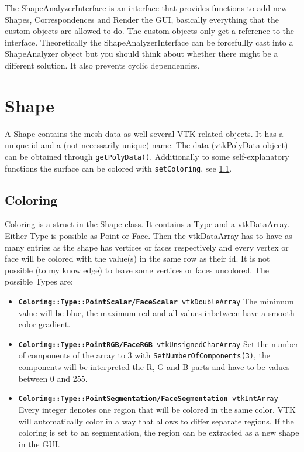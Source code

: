 The ShapeAnalyzerInterface is an interface that provides functions to add new Shapes, Correspondences and Render the GUI, basically everything that the custom objects are allowed to do. The custom objects only get a reference to the interface. Theoretically the ShapeAnalyzerInterface can be forcefullly cast into a ShapeAnalyzer object but you should think about whether there might be a different solution. It also prevents cyclic dependencies.

\section{Shape}
\label{sec:Shape}

A Shape contains the mesh data as well several VTK related objects. It has a unique id and a (not necessarily unique) name. The data (\href{http://www.vtk.org/doc/nightly/html/classvtkPolyData.html}{vtkPolyData} object) can be obtained through \texttt{getPolyData()}. Additionally to some self-explanatory functions the surface can be colored with \texttt{setColoring}, see \ref{subsec:Coloring}.

\subsection{Coloring}
\label{subsec:Coloring}

Coloring is a struct in the Shape class. It contains a Type and a vtkDataArray. Either Type is possible as Point or Face. Then the vtkDataArray has to have as many entries as the shape has vertices or faces respectively and every vertex or face will be colored with the value(s) in the same row as their id. It is not possible (to my knowledge) to leave some vertices or faces uncolored. The possible Types are:

\begin{itemize}
	\item \texttt{\textbf{Coloring::Type::PointScalar/FaceScalar} vtkDoubleArray} The minimum value will be blue, the maximum red and all values inbetween have a smooth color gradient.
	\item \texttt{\textbf{Coloring::Type::PointRGB/FaceRGB} vtkUnsignedCharArray} Set the number of components of the array to 3 with \texttt{SetNumberOfComponents(3)}, the components will be interpreted the R, G and B parts and have to be values between 0 and 255. 
	\item \texttt{\textbf{Coloring::Type::PointSegmentation/FaceSegmentation} vtkIntArray} Every integer denotes one region that will be colored in the same color. VTK will automatically color in a way that allows to differ separate regions. If the coloring is set to an segmentation, the region can be extracted as a new shape in the GUI.
\end{itemize}

